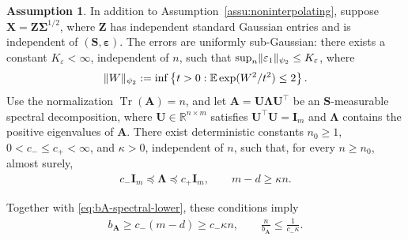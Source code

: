 \documentclass{article}
\theoremstyle{plain}
\theoremstyle{definition}
\newtheorem{assumption}[theorem]{Assumption}
\theoremstyle{definition}
\DeclarePairedDelimiter\norm{\lVert}{\rVert}
\DeclareMathOperator{\trace}{Tr}
\def\R{{\mathbb{R}}}
\def\E{{\mathbb{E}}}
\def\mathbold{\boldsymbol}
\def\cal{\mathcal}
\def\bA{\mathbold{A}}\def\calA{{\cal A}}\def\scrA{{\mathscr A}}\def\Ahat{\widehat{A}}\def\Atil{{\widetilde A}}
\def\bI{\mathbold{I}}\def\hbI{{\widehat{\bI}}}\def\tbI{{\widetilde{\bI}}}
\def\bS{\mathbold{S}}\def\hbS{{\widehat{\bS}}}\def\tbS{{\widetilde{\bS}}}
\def\bU{\mathbold{U}}\def\hbU{{\widehat{\bU}}}\def\tbU{{\widetilde{\bU}}}
\def\bX{\mathbold{X}}\def\hbX{{\widehat{\bX}}}\def\tbX{{\tilde{\bX}}}\def\bXbar{{\overline \bX}}
\def\bZ{\mathbold{Z}}\def\hbZ{{\widehat{\bZ}}}\def\tbZ{{\widetilde{\bZ}}}
\def\ep{\varepsilon}\def\eps{\epsilon}\def\veps{\varepsilon}
\def\bep{ {\mathbold{\ep} }}
\def\bLambda{\mathbold{\Lambda}}\def\hbLambda{{\widehat{\bLambda}}}
\def\bSigma{\mathbold{\Sigma}}\def\hbSigma{{\widehat{\bSigma}}}
\begin{document}
\begin{assumption}
\label{assu:Gaussian-Stein-design}
In addition to Assumption~\ref{assu:noninterpolating}, suppose
$\bX=\bZ\bSigma^{1/2}$, where $\bZ$ has independent standard Gaussian
entries and is independent of $(\bS,\bep)$.
The errors are uniformly sub-Gaussian: there exists a constant
$K_\varepsilon<\infty$, independent of $n$, such that
$\sup_n\norm{\varepsilon_1}_{\psi_2}\leq K_\varepsilon$, where
\begin{align*}
    \norm{W}_{\psi_2}
    :=\inf\left\{t>0:\E\exp(W^2/t^2)\leq2\right\}.
\end{align*}
Use the normalization $\trace(\bA)=n$, and let
$\bA=\bU\bLambda\bU^\top$ be an $\bS$-measurable spectral
decomposition, where $\bU\in\R^{n\times m}$ satisfies
$\bU^\top\bU=\bI_m$ and $\bLambda$ contains the positive eigenvalues
of $\bA$. There exist deterministic constants $n_0\geq1$,
$0<c_-\leq c_+<\infty$, and $\kappa>0$, independent of $n$, such
that, for every $n\geq n_0$, almost surely,
\begin{align}
    c_-\bI_m\preceq\bLambda\preceq c_+\bI_m,
    \qquad
    m-d\geq\kappa n.
    \label{eq:balanced-sketch-conditions}
\end{align}
\end{assumption}
Together with \eqref{eq:bA-spectral-lower}, these conditions imply
\begin{align*}
    b_{\bA}\geq c_-(m-d)\geq c_-\kappa n,
    \qquad \frac{n}{b_{\bA}}\leq\frac{1}{c_-\kappa}.
\end{align*}
\end{document}
